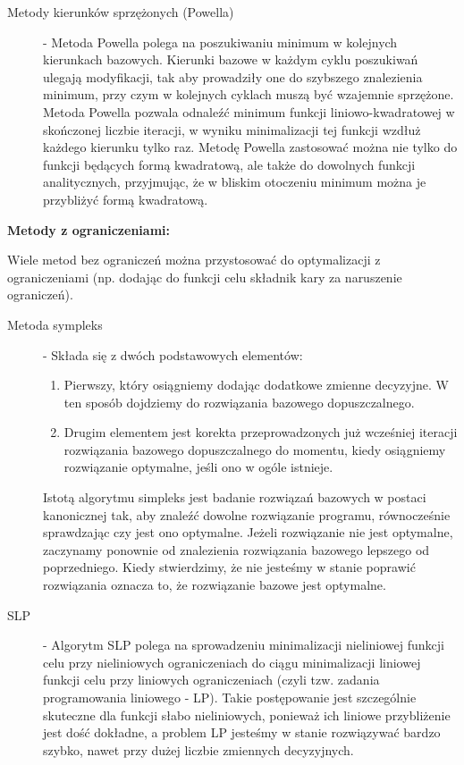 \begin{description}
    \item[Metody kierunków sprzężonych (Powella)] - Metoda Powella polega na poszukiwaniu minimum w kolejnych kierunkach bazowych. Kierunki bazowe w każdym cyklu poszukiwań ulegają modyfikacji, tak aby prowadziły one do szybszego znalezienia minimum, przy czym w kolejnych cyklach muszą być wzajemnie sprzężone. Metoda Powella pozwala odnaleźć minimum funkcji liniowo-kwadratowej w skończonej liczbie iteracji, w wyniku minimalizacji tej funkcji wzdłuż każdego kierunku tylko raz. Metodę Powella zastosować można nie tylko do funkcji będących formą kwadratową, ale także do dowolnych funkcji analitycznych, przyjmując, że w bliskim otoczeniu minimum można je przybliżyć formą kwadratową.
\end{description}

\textbf{Metody z ograniczeniami:}

Wiele metod bez ograniczeń można przystosować do optymalizacji z ograniczeniami (np. dodając do funkcji celu składnik kary za naruszenie ograniczeń).

\begin{description}
    \item[Metoda sympleks] - Składa się z dwóch podstawowych elementów:\mbox{}
    \begin{enumerate}
        \item Pierwszy, który osiągniemy dodając dodatkowe zmienne decyzyjne. W ten sposób dojdziemy do rozwiązania bazowego dopuszczalnego.
        \item Drugim elementem jest korekta przeprowadzonych już wcześniej iteracji rozwiązania bazowego dopuszczalnego do momentu, kiedy osiągniemy rozwiązanie optymalne, jeśli ono w ogóle istnieje.
    \end{enumerate}
    Istotą algorytmu simpleks jest badanie rozwiązań bazowych w postaci kanonicznej tak, aby znaleźć dowolne rozwiązanie programu, równocześnie sprawdzając czy jest ono optymalne. Jeżeli rozwiązanie nie jest optymalne, zaczynamy ponownie od znalezienia rozwiązania bazowego lepszego od poprzedniego. Kiedy stwierdzimy, że nie jesteśmy w stanie poprawić rozwiązania oznacza to, że rozwiązanie bazowe jest optymalne.
    \item[SLP] - Algorytm SLP polega na sprowadzeniu minimalizacji nieliniowej funkcji celu przy nieliniowych ograniczeniach do ciągu minimalizacji liniowej funkcji celu przy liniowych ograniczeniach (czyli tzw. zadania programowania liniowego - LP). Takie postępowanie jest szczególnie skuteczne dla funkcji słabo nieliniowych, ponieważ ich liniowe przybliżenie jest dość dokładne, a problem LP jesteśmy w stanie rozwiązywać bardzo szybko, nawet przy dużej liczbie zmiennych decyzyjnych.
\end{description}


